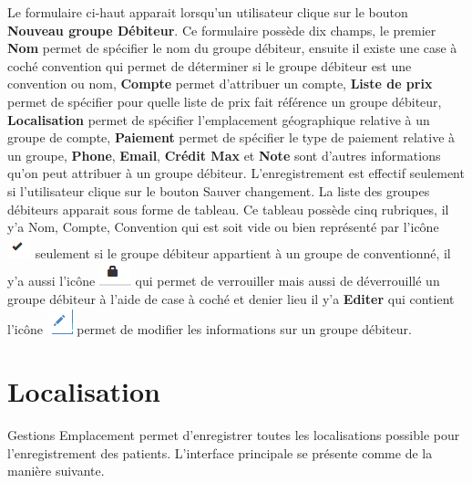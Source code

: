 \documentclass[12pt,a4paper]{report}
\begin{document}
Le formulaire ci-haut apparait lorsqu'un utilisateur clique sur le bouton \textbf{Nouveau groupe Débiteur}. Ce formulaire possède dix champs, le premier \textbf{Nom} permet de spécifier le nom du groupe débiteur, ensuite il existe une case à coché convention qui permet de déterminer si le groupe débiteur est une convention ou nom, \textbf{Compte }permet d'attribuer un compte, \textbf{Liste de prix}  permet de spécifier pour quelle liste de prix fait référence un groupe débiteur, \textbf{Localisation} permet de spécifier l'emplacement géographique relative à un groupe de compte, \textbf{Paiement} permet de spécifier le type de paiement relative à un groupe,\textbf{ Phone}, \textbf{Email}, \textbf{Crédit Max }et \textbf{Note} sont d'autres informations qu'on peut attribuer à un groupe débiteur.
L'enregistrement est effectif seulement si l'utilisateur clique sur le bouton Sauver changement.
La liste des groupes débiteurs apparait sous forme de tableau. Ce tableau possède cinq rubriques, il y'a Nom, Compte, Convention qui est soit vide ou bien représenté par l'icône \includegraphics[scale=0.7]{pic/IconOk.png}  seulement si le groupe débiteur appartient à un groupe de conventionné,  il y'a aussi l'icône \includegraphics[scale=0.7]{pic/Locked.png}  qui permet de verrouiller mais aussi de déverrouillé un groupe débiteur à l'aide de case à coché et denier lieu il y'a \textbf{Editer} qui contient l'icône \includegraphics[scale=0.7]{pic/EditUser.png}   permet de modifier les informations sur un groupe débiteur.

\newpage
\section{Localisation}
Gestions Emplacement permet d'enregistrer toutes les localisations possible pour l'enregistrement des patients. L'interface principale se présente comme de la manière suivante.
\end{document}
